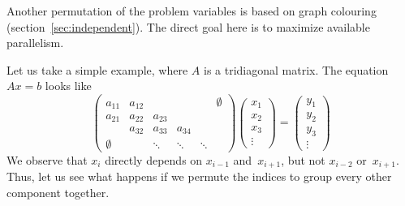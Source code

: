 

Another permutation of the problem variables is based on graph colouring
(section~\ref{sec:independent}). The direct goal here is to maximize
available parallelism.

Let us take a
simple example, where $A$ is a tridiagonal matrix. The equation $Ax=b$
looks like
\[ 
\begin{pmatrix}
  a_{11}&a_{12}&&&&\emptyset\\ a_{21}&a_{22}&a_{23}\\ 
  &a_{32}&a_{33}&a_{34}\\ \emptyset&&\ddots&\ddots&\ddots
\end{pmatrix}
\begin{pmatrix}  x_1\\ x_2\\ x_3\\ \vdots\end{pmatrix} =
\begin{pmatrix}  y_1\\ y_2\\ y_3\\ \vdots\end{pmatrix}
\]
We observe that $x_i$ directly depends on $x_{i-1}$ and~$x_{i+1}$, but
not $x_{i-2}$ or~$x_{i+1}$. Thus, let us see what happens if we
permute the indices to group every other component together.

